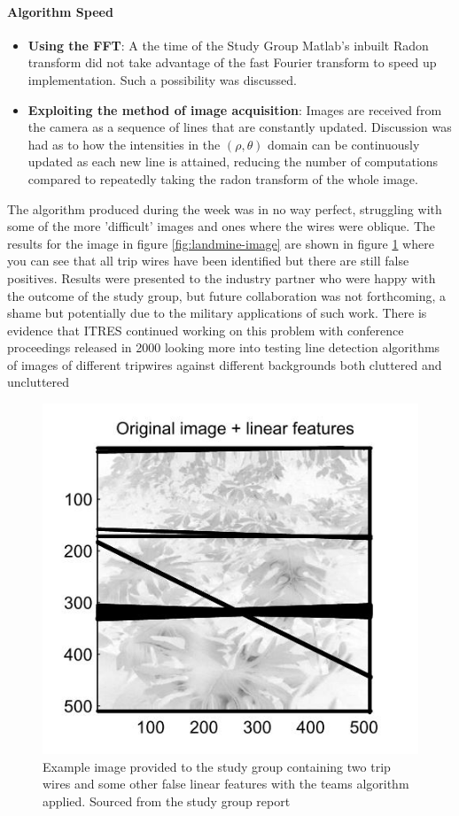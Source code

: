 \documentclass[11pt]{article} %
\begin{document}
	\paragraph{Algorithm Speed}
		\begin{itemize}
		\item \textbf{Using the FFT}: A the time of the Study Group Matlab's inbuilt Radon transform did not take advantage of the fast Fourier transform to speed up implementation. Such a possibility was discussed. 
		\item \textbf{Exploiting the method of image acquisition}: Images are received from the camera as a sequence of lines that are constantly updated. Discussion was had as to how the intensities in the $ (\rho, \theta)$ domain can be continuously updated as each new line is attained, reducing the number of computations compared to repeatedly taking the radon transform of the whole image. 
	\end{itemize}
	
	The algorithm produced during the week was in no way perfect, struggling with some of the more 'difficult' images and ones where the wires were oblique. The results for the image in figure \ref{fig:landmine-image} are shown in figure \ref{fig:landmine-linear-features}   where you can see that all trip wires have been identified but there are still false positives. Results were presented to the industry partner who were happy with the outcome of the study group,  but future collaboration was not forthcoming, a shame but potentially due to the military applications of such work. There is evidence that ITRES continued working on this problem with conference proceedings released in 2000 \cite{Babey} looking more into testing line detection algorithms of images of different tripwires against different backgrounds both cluttered and uncluttered
	
\begin{figure}
	\centering
	\includegraphics[width=0.7\linewidth]{"Report_images/landmine linear features"}
	\caption{Example image provided to the study group containing two trip wires and some other false linear features with the teams algorithm applied. Sourced from the study group report \cite{Jessop}}
	\label{fig:landmine-linear-features}
\end{figure}
\end{document}
